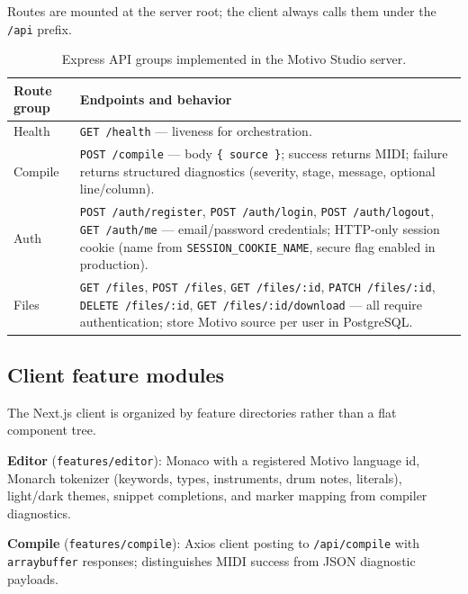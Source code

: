 Routes are mounted at the server root; the client always calls them under the \texttt{/api} prefix.

\begin{table}[htbp]
  \centering
  \renewcommand{\arraystretch}{1.25}
  \begin{tabularx}{\textwidth}{>{\raggedright\arraybackslash}p{3.4cm}X}
    \toprule
    \textbf{Route group} & \textbf{Endpoints and behavior} \\
    \midrule
    Health & \texttt{GET /health} --- liveness for orchestration. \\
    Compile & \texttt{POST /compile} --- body \texttt{\{ source \}}; success returns MIDI; failure returns structured
    diagnostics (severity, stage, message, optional line/column). \\
    Auth & \texttt{POST /auth/register}, \texttt{POST /auth/login}, \texttt{POST /auth/logout}, \texttt{GET /auth/me}
    --- email/password credentials; HTTP-only session cookie (name from \texttt{SESSION\_COOKIE\_NAME}, secure flag
    enabled in production). \\
    Files & \texttt{GET /files}, \texttt{POST /files}, \texttt{GET /files/:id}, \texttt{PATCH /files/:id},
    \texttt{DELETE /files/:id}, \texttt{GET /files/:id/download} --- all require authentication; store Motivo source
    per user in PostgreSQL. \\
    \bottomrule
  \end{tabularx}
  \caption{Express API groups implemented in the Motivo Studio server.}\label{tab:studio-api}
\end{table}

\subsection{Client feature modules}\label{subsec:studio-client-modules}

The Next.js client is organized by feature directories rather than a flat component tree.

\noindent\textbf{Editor} (\texttt{features/editor}): Monaco with a registered Motivo language id, Monarch tokenizer
(keywords, types, instruments, drum notes, literals), light/dark themes, snippet completions, and marker mapping from
compiler diagnostics.

\noindent\textbf{Compile} (\texttt{features/compile}): Axios client posting to \texttt{/api/compile} with
\texttt{arraybuffer} responses; distinguishes MIDI success from JSON diagnostic payloads.

